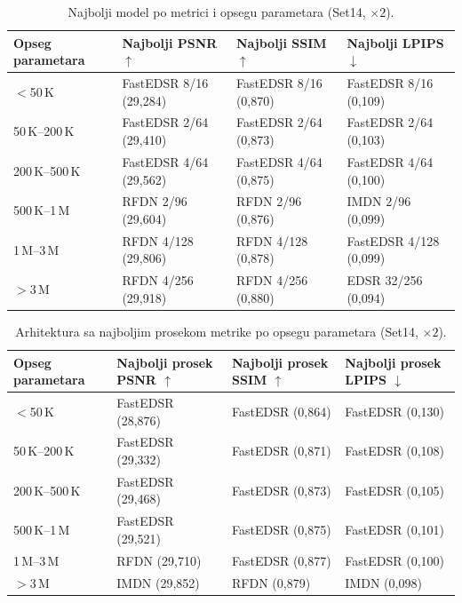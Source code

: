 
\begin{table}[H]
    \centering
    \caption{Najbolji model po metrici i opsegu parametara (Set14, $\times2$).}
    \label{tab:param_bins_best_model_2x_Set14}
    \small
    \setlength{\tabcolsep}{4pt}
    \begin{tabular}{@{}llll@{}}
        \toprule
        Opseg parametara & Najbolji PSNR $\uparrow$ & Najbolji SSIM $\uparrow$ & Najbolji LPIPS $\downarrow$ \\
        \midrule
        $<$50\,K & FastEDSR 8/16 (29,284) & FastEDSR 8/16 (0,870) & FastEDSR 8/16 (0,109) \\
        50\,K--200\,K & FastEDSR 2/64 (29,410) & FastEDSR 2/64 (0,873) & FastEDSR 2/64 (0,103) \\
        200\,K--500\,K & FastEDSR 4/64 (29,562) & FastEDSR 4/64 (0,875) & FastEDSR 4/64 (0,100) \\
        500\,K--1\,M & RFDN 2/96 (29,604) & RFDN 2/96 (0,876) & IMDN 2/96 (0,099) \\
        1\,M--3\,M & RFDN 4/128 (29,806) & RFDN 4/128 (0,878) & FastEDSR 4/128 (0,099) \\
        $>$3\,M & RFDN 4/256 (29,918) & RFDN 4/256 (0,880) & EDSR 32/256 (0,094) \\
        \bottomrule
    \end{tabular}
\end{table}

\begin{table}[H]
    \centering
    \caption{Arhitektura sa najboljim prosekom metrike po opsegu parametara (Set14, $\times2$).}
    \label{tab:param_bins_best_arch_2x_Set14}
    \small
    \setlength{\tabcolsep}{4pt}
    \begin{tabular}{@{}llll@{}}
        \toprule
        Opseg parametara & Najbolji prosek PSNR $\uparrow$ & Najbolji prosek SSIM $\uparrow$ & Najbolji prosek LPIPS $\downarrow$ \\
        \midrule
        $<$50\,K & FastEDSR (28,876) & FastEDSR (0,864) & FastEDSR (0,130) \\
        50\,K--200\,K & FastEDSR (29,332) & FastEDSR (0,871) & FastEDSR (0,108) \\
        200\,K--500\,K & FastEDSR (29,468) & FastEDSR (0,873) & FastEDSR (0,105) \\
        500\,K--1\,M & FastEDSR (29,521) & FastEDSR (0,875) & FastEDSR (0,101) \\
        1\,M--3\,M & RFDN (29,710) & FastEDSR (0,877) & FastEDSR (0,100) \\
        $>$3\,M & IMDN (29,852) & RFDN (0,879) & IMDN (0,098) \\
        \bottomrule
    \end{tabular}
\end{table}
